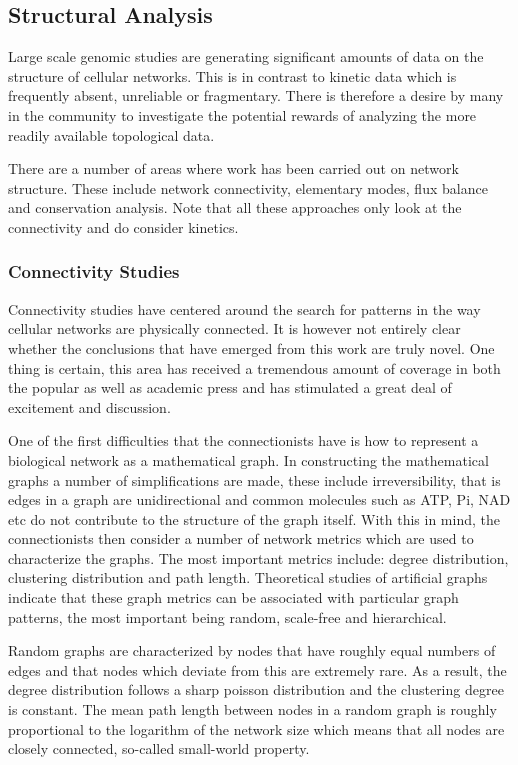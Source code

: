 
\subsection{Structural Analysis}

Large scale genomic studies are generating significant amounts of
data on the structure of cellular networks. This is in contrast to
kinetic data which is frequently absent, unreliable or
fragmentary. There is therefore a desire by many in the community
to investigate the potential rewards of analyzing the more readily
available topological data.

There are a number of areas where work has been carried out on
network structure. These include network connectivity, elementary
modes, flux balance and conservation analysis. Note that all these
approaches only look at the connectivity and do consider kinetics.

\subsubsection{Connectivity Studies}

Connectivity studies have centered around the search for patterns
in the way cellular networks are physically connected. It is
however not entirely clear whether the conclusions that have
emerged from this work are truly novel. One thing is certain, this
area has received a tremendous amount of coverage in both the
popular as well as academic press and has stimulated a great deal
of excitement and discussion.

One of the first difficulties that the connectionists have is how
to represent a biological network as a mathematical graph. In
constructing the mathematical graphs a number of simplifications
are made, these include irreversibility, that is edges in a graph
are unidirectional and common molecules such as ATP, Pi, NAD etc
do not contribute to the structure of the graph itself. With this
in mind, the connectionists then consider a number of network
metrics which are used to characterize the graphs. The most
important metrics include: degree distribution, clustering
distribution and path length. Theoretical studies of artificial
graphs indicate that these graph metrics can be associated with
particular graph patterns, the most important being random,
scale-free and hierarchical.

Random graphs are characterized by nodes that have roughly equal
numbers of edges and that nodes which deviate from this are
extremely rare. As a result, the degree distribution follows a
sharp poisson distribution and the clustering degree is constant.
The mean path length between nodes in a random graph is roughly
proportional to the logarithm of the network size which means that
all nodes are closely connected, so-called small-world property.

